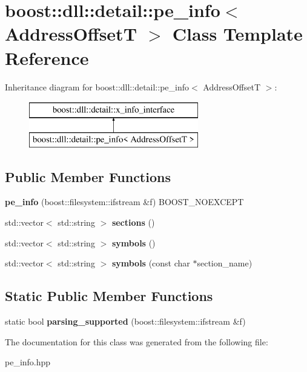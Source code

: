 \hypertarget{a01620}{}\section{boost\+:\+:dll\+:\+:detail\+:\+:pe\+\_\+info$<$ Address\+OffsetT $>$ Class Template Reference}
\label{a01620}
Inheritance diagram for boost\+:\+:dll\+:\+:detail\+:\+:pe\+\_\+info$<$ Address\+OffsetT $>$\+:\begin{figure}[H]
\begin{center}
\leavevmode
\includegraphics[height=2.000000cm]{a01620}
\end{center}
\end{figure}
\subsection*{Public Member Functions}
\begin{DoxyCompactItemize}
\item 
\mbox{\label{a01620_a7163781ab5af1ea8119eb71fe4d67e9f}} 
{\bfseries pe\+\_\+info} (boost\+::filesystem\+::ifstream \&f) B\+O\+O\+S\+T\+\_\+\+N\+O\+E\+X\+C\+E\+PT
\item 
\mbox{\label{a01620_a4fb005ab609ec3c0bf48ae3537076815}} 
std\+::vector$<$ std\+::string $>$ {\bfseries sections} ()
\item 
\mbox{\label{a01620_a7801ec9a67fe66f728fb7feb9faa617f}} 
std\+::vector$<$ std\+::string $>$ {\bfseries symbols} ()
\item 
\mbox{\label{a01620_ab5aee53c8aed8e3da1f2aa56ddc486e5}} 
std\+::vector$<$ std\+::string $>$ {\bfseries symbols} (const char $\ast$section\+\_\+name)
\end{DoxyCompactItemize}
\subsection*{Static Public Member Functions}
\begin{DoxyCompactItemize}
\item 
\mbox{\label{a01620_a74f919531d64b61f01779b050f2e8812}} 
static bool {\bfseries parsing\+\_\+supported} (boost\+::filesystem\+::ifstream \&f)
\end{DoxyCompactItemize}


The documentation for this class was generated from the following file\+:\begin{DoxyCompactItemize}
\item 
pe\+\_\+info.\+hpp\end{DoxyCompactItemize}
